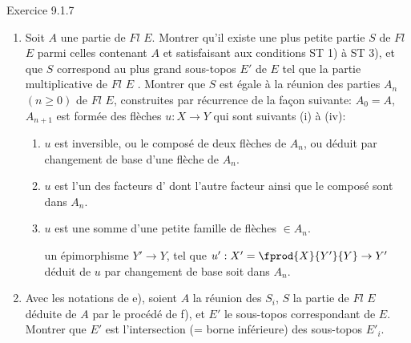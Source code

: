 \documentclass[10pt]{../fichiers-configuration-latex/smfart}
\begin{document}
\begin{enonce*}[remark]{Exercice 9.1.7}
\begin{enumerate}
\item Soit $A$ une partie de $Fl$ $E$. Montrer qu'il existe une plus
petite partie $S$ de $Fl$ $E$ parmi celles contenant $A$ et
satisfaisant aux conditions ST 1) à ST 3), et que $S$ correspond au
plus grand sous-topos $E'$ de $E$ tel que la partie multiplicative
de $Fl$ $E$ . Montrer que $S$ est égale
à la réunion des parties $A_n$ $(n\geq 0)$ de $Fl$ $E$, construites
par récurrence de la façon suivante: $A_0=A$, $A_{n+1}$ est
formée des flèches $u:X\rightarrow Y$ qui sont 
suivants (i) à (iv):
\begin{enumerate}
\renewcommand{\theenumii}{\roman{enumii}}
\renewcommand{\labelenumii}{(\theenumii)}
\item $u$ est inversible, ou le composé de deux flèches de $A_n$,
ou déduit par changement de base d'une flèche de $A_n$.

\item $u$ est l'un des facteurs d' dont
l'autre facteur ainsi que le composé sont dans $A_n$.

\item $u$ est une somme d'une petite famille de flèches $\in
A_n$.

 un épimorphisme $Y'\rightarrow Y$, tel que
$u':X'=\fprod{X}{Y'}{Y}\rightarrow Y'$ déduit de $u$ par changement
de base soit dans $A_n$.
\end{enumerate}

\item Avec les notations de e), soient $A$ la réunion des $S_i$, $S$
la partie de $Fl$ $E$ déduite de $A$ par le procédé de f), et $E'$
le sous-topos correspondant de $E$. Montrer que $E'$ est
l'intersection (= borne inférieure) des sous-topos $E'_i$.
\end{enumerate}
\end{enonce*}
\end{document}
